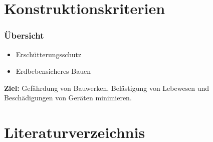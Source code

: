 \documentclass[hyperref={pdfpagemode=FullScreen, colorlinks=false}]{beamer}
\begin{document}
\maketitle


\section{Konstruktionskriterien}

\begin{frame}
\frametitle{Übersicht}
\begin{itemize} %
 \item Erschütterungsschutz   
 \item Erdbebensicheres Bauen
\end{itemize}
\textbf{Ziel:} Gefährdung von Bauwerken, Belästigung von Lebewesen und Beschädigungen von Geräten minimieren.
\end{frame}







\section*{Literaturverzeichnis}

\begin{frame}[allowframebreaks]{}
	\printbibliography
\end{frame}
\end{document}
